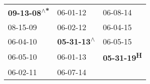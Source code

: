 \begin{supertabular}{lll}
 \textbf{09-13-08\textsuperscript{$\wedge$*}} &                   06-01-12\textsuperscript{} &            06-08-14\textsuperscript{} \\
                   08-15-09\textsuperscript{} &                   06-02-12\textsuperscript{} &            06-04-15\textsuperscript{} \\
                   06-04-10\textsuperscript{} &  \textbf{05-31-13\textsuperscript{$\wedge$}} &            06-05-15\textsuperscript{} \\
                   06-05-10\textsuperscript{} &                   06-01-13\textsuperscript{} &  \textbf{05-31-19\textsuperscript{H}} \\
                   06-02-11\textsuperscript{} &                   06-07-14\textsuperscript{} &                                       \\
\end{supertabular}
